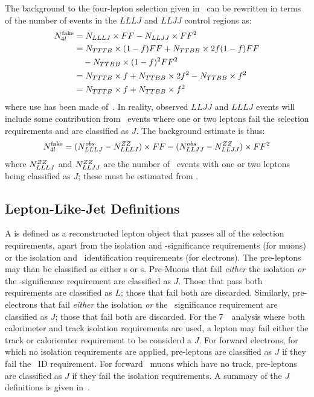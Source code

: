 The background to the four-lepton selection given in~ can 
be rewritten in terms of the number of events in the $LLLJ$ and $LLJJ$ control
regions as:
\begin{align}
N_{4l}^{\rm fake} &= N_{LLLJ} \times FF - N_{LLJJ} \times FF^{2} \notag \\
 &= N_{TTTB} \times (1-f) FF + N_{TTBB} \times 2f (1 - f) FF \notag \\
 &\quad - N_{TTBB} \times (1-f)^{2} FF^{2} \notag \\
 &=  N_{TTTB} \times f + N_{TTBB} \times 2 f^{2} - N_{TTBB} \times f^{2} \notag \\
 &= N_{TTTB} \times f + N_{TTBB} \times f^{2} 
\end{align}
where use has been made of~. In reality, observed
$LLJJ$ and $LLLJ$ events will include some contribution from \ZZllll\ events where
one or two leptons fail the selection requirements and are classified as $J$.
The background estimate is thus:
\begin{equation}
N_{4l}^{\rm fake} = (N^{obs}_{LLLJ} - N^{ZZ}_{LLLJ}) \times FF -
(N^{obs}_{LLJJ} - N^{ZZ}_{LLJJ})\times FF^{2} 
\end{equation}
where $N^{ZZ}_{LLLJ}$ and $N^{ZZ}_{LLJJ}$ are the number of \ZZ\ events with
one or two leptons being classified as $J$; these must be estimated from \mcsim.

\subsection{Lepton-Like-Jet Definitions}

A  is defined as a reconstructed lepton object that passes all of
the selection requirements, apart from the isolation and \dzero-significance
requirements (for muons) or the isolation and \loosePP\ identification
requirements (for electrons). The pre-leptons may than be classified as either \lljet s or \sellep s.
Pre-Muons that fail {\it either} the isolation {\it or} the
\dzero-significance requirement are classified as $J$. Those that pass both requirements are
classified as $L$; those that fail both are
discarded. Similarly, pre-electrons that fail {\it either} the isolation {\it or} the
\loosePP\ significance requirement are classified as $J$; those that fail both are
discarded. For the 7~\tev\ analysis where both calorimeter and track isolation
requirements are used, a lepton may fail either the track or caloriemter requirement
to be considerd a $J$. For forward electrons, for which no isolation
requirements are applied, pre-leptons are classified as $J$
if they fail the \tight\ ID requirement. For forward \standAlone\ muons which have
no track, pre-leptons are classified as $J$ if they fail the isolation
requirements. A summary of the $J$ definitions is
given in~.

